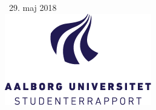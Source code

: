 \begin{center}
{\large \ 29. maj 2018}\\[0.5cm] %



\includegraphics[height=4cm]{billeder/AAU-logo-stud-DK-RGB} %
 

\vfill %
\end{center}